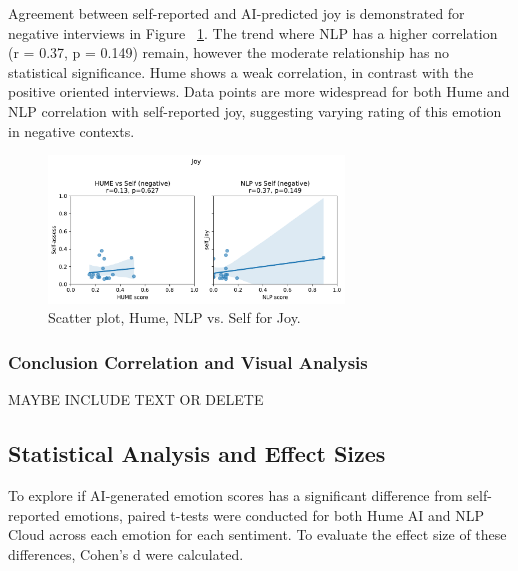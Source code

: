 Agreement between self-reported and AI-predicted joy is demonstrated for negative interviews in Figure ~\ref{fig:scatter-joy-rq3-neg}.
The trend where NLP has a higher correlation (r = 0.37, p = 0.149) remain, however the moderate relationship has no statistical significance. Hume shows a weak correlation, in contrast with the positive oriented interviews. Data points are more widespread for both Hume and NLP correlation with self-reported joy, suggesting varying rating of this emotion in negative contexts. 
\begin{figure}[H]
    \centering
    \includegraphics[width=0.7\textwidth]{png/results/rq3/scatter_joy_vs_self_negative.pdf}
    \caption{Scatter plot, Hume, NLP vs. Self for Joy.}
    \label{fig:scatter-joy-rq3-neg}
\end{figure}

\medskip

\subsubsection{Conclusion Correlation and Visual Analysis}

MAYBE INCLUDE TEXT OR DELETE 

\subsection{Statistical Analysis and Effect Sizes}

To explore if AI-generated emotion scores has a significant difference from self-reported emotions, paired t-tests were conducted for both Hume AI and NLP Cloud across each emotion for each sentiment. 
To evaluate the effect size of these differences, Cohen's d were calculated. 

